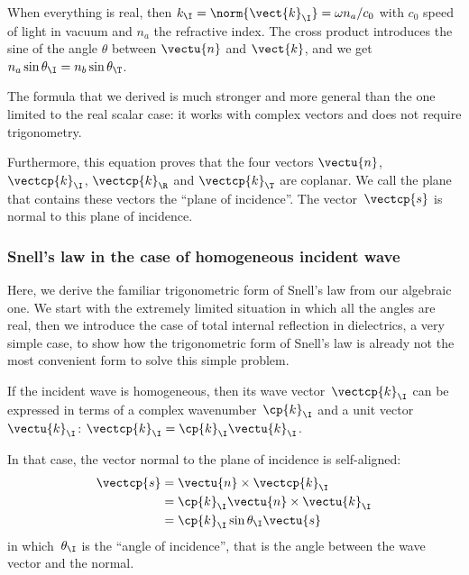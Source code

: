 When everything is real, then $k_\I=\norm{\vect{k}_\I}=\omega n_a / c_0$ with $c_0$ speed of light in vacuum and $n_a$ the refractive index.
The cross product introduces the sine of the angle $\theta$ between $\vectu{n}$ and $\vect{k}$, and we get
$n_a \sin{\theta_\I} = n_b \sin{\theta_\T}$.

The formula that we derived is much stronger and more general than the one limited to the real scalar case: it works with complex vectors and does not require trigonometry.

Furthermore, this equation proves that the four vectors $\vectu{n}$, $\vectcp{k}_\I$, $\vectcp{k}_\R$ and $\vectcp{k}_\T$ are coplanar.
We call the plane that contains these vectors the ``plane of incidence''.
The vector~$\vectcp{s}$ is normal to this plane of incidence.

\subsubsection{Snell's law in the case of homogeneous incident wave}
Here, we derive the familiar trigonometric form of Snell's law from our algebraic one.
We start with the extremely limited situation in which all the angles are real, then we introduce the case of total internal reflection in dielectrics, a very simple case, to show how the trigonometric form of Snell's law is already not the most convenient form to solve this simple problem.

If the incident wave is homogeneous, then its
wave vector~$\vectcp{k}_\I$ can be expressed in terms of a complex wavenumber~$\cp{k}_\I$ and a unit vector~$\vectu{k}_\I$: $\vectcp{k}_\I = \cp{k}_\I \vectu{k}_\I$.

In that case, the vector normal to the plane of incidence is self-aligned:
\begin{subequations}
    \begin{align}
        \vectcp{s}
        &=
        \vectu{n} \times \vectcp{k}_\I
        \\
        &= \cp{k}_\I \vectu{n} \times \vectu{k}_\I
        \\
        &= \cp{k}_\I \sin \theta_\I \vectu{s}
    \end{align}
\end{subequations}
in which~$\theta_\I$ is the ``angle of incidence'', that is the angle between the wave vector and the normal.

